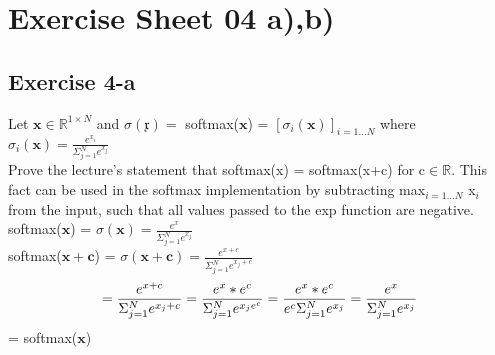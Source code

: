 \section*{Exercise Sheet 04 a),b)}

\vspace{0,75cm}

\subsection*{Exercise 4-a}
Let $\mathbf{x} \in \mathbb{R}^{1 \times N}$ and $\sigma(\mathfrak{x}) = $ softmax($\mathbf{x}$) = 
$[\sigma_{i}(\mathbf{x})]_{i = 1...N}$ where $\sigma_{i}(\mathbf{x}) = \frac{e^{x_{i}}}{\Sigma_{j=1}^{N} e^{x_{j}}}$\\
Prove the lecture's statement that softmax(x) = softmax(x+c) for c$\in \mathbb{R}$. This fact can be used in the softmax implementation by subtracting max$_{i=1...N}$ x$_{i}$ from the input, such that all values passed to the exp function are negative.\\
\linebreak
softmax($\mathbf{x}$) = $\sigma(\mathbf{x}) = \frac{e^{x}}{\Sigma_{j=1}^{N} e^{x_{j}}}$\\
softmax($\mathbf{x + c}$) = $\sigma(\mathbf{x + c}) = \frac{e^{x + c}}{\Sigma_{j=1}^{N} e^{x_{j} + c}}$\\
\[
= \frac{e^{x + c}}{\Sigma_{j=1}^{N} e^{x_{j} + c}} \linebreak
= \frac{e^{x} * e^{c}}{\Sigma_{j=1}^{N} e^{x_{j} e^{c}}} \linebreak
= \frac{e^{x} * e^{c}}{ e^{c} \Sigma_{j=1}^{N} e^{x_{j}}} \linebreak
= \frac{e^{x}}{\Sigma_{j=1}^{N} e^{x_{j}}}
\]
= softmax($\mathbf{x}$)

